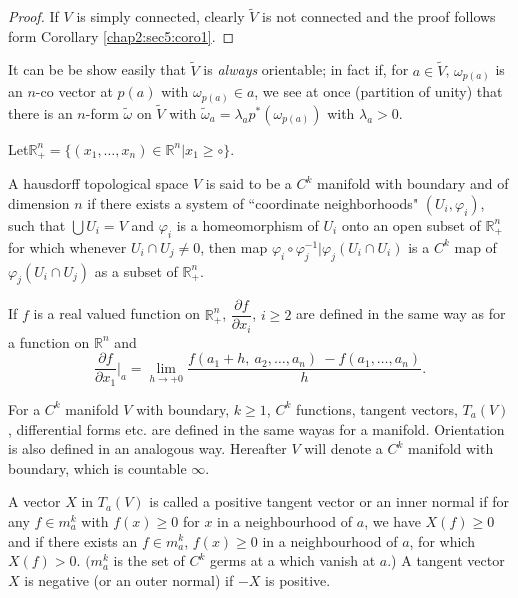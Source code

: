 \begin{proof}
  If  $V$ is simply connected, clearly $\tilde{V}$ is not connected
  and the proof follows form Corollary \ref{chap2:sec5:coro1}. 
\end{proof}

It can be be show  easily that $\tilde{V}$ is \textit{always}
orientable; in fact if, for $a \in \tilde{V}$, $ \omega_{p (a)}$ is an
$n$-co vector at $p (a)$ with $\omega_{p (a)} \in a$, we see at once 
(partition of unity) that  there is an $n$-form $\tilde{\omega}$ on
$\tilde{V}$ with  $\tilde{\omega}_a  = \lambda_a p^*  (\omega_{p
  (a)})$ with  $\lambda_a > 0$. 

Let\qquad $\mathbb{R}^n_+ = \big\{ (x_1, \ldots ,x_n) \in
\mathbb{R}^n | x_1 \geq \circ \big\}$. 

\begin{defi*}
  A hausdorff topological space $V$ is said to be a $C^k$ manifold
  with boundary and of dimension $n$ if there exists  a system of
  ``coordinate neighborhoods" $(U_i, \varphi_i )$, such that $\bigcup
  U_i = V$ and $\varphi_i$ is a homeomorphism of $U_i$ onto an open
  subset of $\mathbb{R}^n_+$ for which whenever  $U_i \cap U_j \neq
  0$, then map $\varphi_i \circ \varphi^{-1}_j \Big| \varphi_j (U_i
  \cap U_i )$ is a $C^k$ map of  $\varphi_j (U_i \cap U_j)$ as a
  subset of $\mathbb{R}^n_+$. 
\end{defi*}

If  $f$ is a real valued function on $\mathbb{R}^n_+$,
$\dfrac{\partial f}{\partial x_i}$, $ i \geq 2$ are defined in the
same way as for a function  on  $\mathbb{R}^n$ and  
$$
\dfrac{\partial
  f}{\partial x_1} \Big|_a = \lim\limits_{h \to  + 0} \dfrac{f
  (a_1 +h, ~ a_2, \ldots, a_n) ~ - f (a_1, \ldots , a_n)}{h}.
$$

For a  $C^k$ manifold $V$ with boundary, $k \geq 1$, $C^k$ functions,
tangent vectors, $T_a (V)$, differential forms etc. are defined in the
same way\pageoriginale as for a manifold. Orientation is  also defined in an
analogous way. Hereafter $V$ will denote a $C^k$ manifold with
boundary, which is countable $\infty$. 

\begin{defi*}
  A vector $X$ in $T_a (V)$ is called a positive tangent vector or an
  inner normal if for any $f \in m^k_a$ with $f (x) \geq 0$ for $x$ in
  a neighbourhood of $a$, we have $X (f) \geq 0$ and if there exists an
  $f \in m^k_a$, $f (x) \geq 0$ in a neighbourhood of $a$, for which
  $X (f) > 0$. $(m^k_a$ is the set of  $C^k$ germs at a which vanish
  at $a$.) A tangent vector $X$ is negative (or an outer normal) if
  $-X$ is positive. 
\end{defi*}

